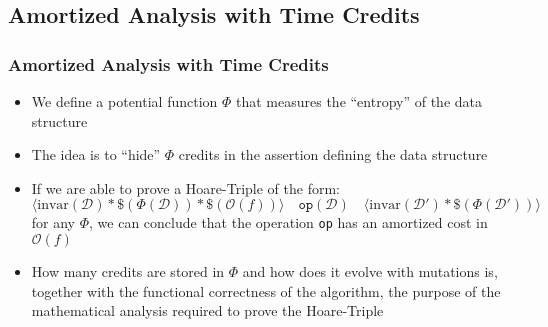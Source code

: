 \subsection{Amortized Analysis with Time Credits}
\begin{frame}
	\frametitle{Amortized Analysis with Time Credits}
	\begin{itemize}
		\item We define a potential function $\Phi$ that measures the ``entropy'' of the data structure
		\item The idea is to ``hide'' $\Phi$ credits in the assertion defining the data structure
		\item If we are able to prove a Hoare-Triple of the form:
		\begin{equation*}
		\langle \mathrm{invar}(\mathcal{D}) * \$(\Phi(\mathcal{D})) * \$(\mathcal{O}(f)) \rangle 
		\quad \mathtt{op}(\mathcal{D}) \quad 
		\langle \mathrm{invar}(\mathcal{D'}) * \$(\Phi(\mathcal{D}')) \rangle
		\end{equation*}
		for any $\Phi$, we can conclude that the operation \texttt{op} has an amortized cost in $\mathcal{O}(f)$
		\item How many credits are stored in $\Phi$ and how does it evolve with mutations is, together with the functional correctness of the algorithm, the purpose of the mathematical analysis required to prove the Hoare-Triple
	\end{itemize}
\end{frame}

